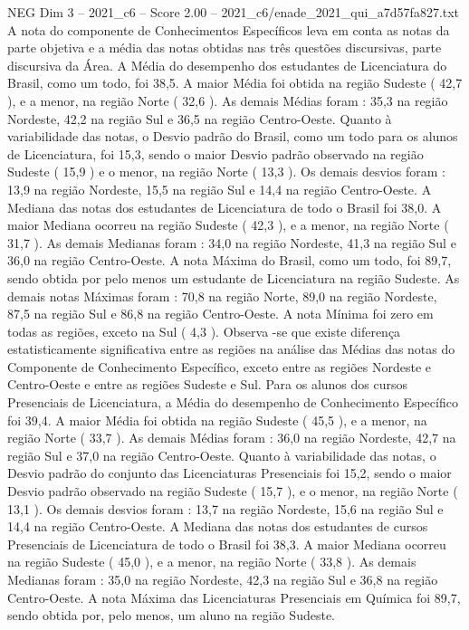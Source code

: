\begin{textsample}{NEG Dim 3 – 2021\_c6 – Score 2.00 – 2021\_c6/enade\_2021\_qui\_a7d57fa827.txt}
A nota do componente de Conhecimentos Específicos leva em conta as notas da parte objetiva e a média das notas obtidas nas três questões discursivas, parte discursiva da Área.
A Média do desempenho dos estudantes de Licenciatura do Brasil, como um todo, foi 38,5.
A maior Média foi obtida na região Sudeste ( 42,7 ), e a menor, na região Norte ( 32,6 ).
As demais Médias foram : 35,3 na região Nordeste, 42,2 na região Sul e 36,5 na região Centro-Oeste.
Quanto à variabilidade das notas, o Desvio padrão do Brasil, como um todo para os alunos de Licenciatura, foi 15,3, sendo o maior Desvio padrão observado na região Sudeste ( 15,9 ) e o menor, na região Norte ( 13,3 ).
Os demais desvios foram : 13,9 na região Nordeste, 15,5 na região Sul e 14,4 na região Centro-Oeste.
A Mediana das notas dos estudantes de Licenciatura de todo o Brasil foi 38,0.
A maior Mediana ocorreu na região Sudeste ( 42,3 ), e a menor, na região Norte ( 31,7 ).
As demais Medianas foram : 34,0 na região Nordeste, 41,3 na região Sul e 36,0 na região Centro-Oeste.
A nota Máxima do Brasil, como um todo, foi 89,7, sendo obtida por pelo menos um estudante de Licenciatura na região Sudeste.
As demais notas Máximas foram : 70,8 na região Norte, 89,0 na região Nordeste, 87,5 na região Sul e 86,8 na região Centro-Oeste.
A nota Mínima foi zero em todas as regiões, exceto na Sul ( 4,3 ).
Observa -se que existe diferença estatisticamente significativa entre as regiões na análise das Médias das notas do Componente de Conhecimento Específico, exceto entre as regiões Nordeste e Centro-Oeste e entre as regiões Sudeste e Sul.
Para os alunos dos cursos Presenciais de Licenciatura, a Média do desempenho de Conhecimento Específico foi 39,4.
A maior Média foi obtida na região Sudeste ( 45,5 ), e a menor, na região Norte ( 33,7 ).
As demais Médias foram : 36,0 na região Nordeste, 42,7 na região Sul e 37,0 na região Centro-Oeste.
Quanto à variabilidade das notas, o Desvio padrão do conjunto das Licenciaturas Presenciais foi 15,2, sendo o maior Desvio padrão observado na região Sudeste ( 15,7 ), e o menor, na região Norte ( 13,1 ).
Os demais desvios foram : 13,7 na região Nordeste, 15,6 na região Sul e 14,4 na região Centro-Oeste.
A Mediana das notas dos estudantes de cursos Presenciais de Licenciatura de todo o Brasil foi 38,3.
A maior Mediana ocorreu na região Sudeste ( 45,0 ), e a menor, na região Norte ( 33,8 ).
As demais Medianas foram : 35,0 na região Nordeste, 42,3 na região Sul e 36,8 na região Centro-Oeste.
A nota Máxima das Licenciaturas Presenciais em Química foi 89,7, sendo obtida por, pelo menos, um aluno na região Sudeste.

\end{textsample}
